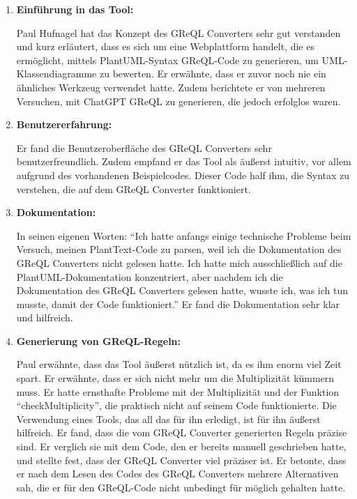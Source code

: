 \begin{enumerate}[itemsep=8pt, parsep=5pt]
    \item \textbf{Einführung in das Tool:}

    Paul Hufnagel hat das Konzept des GReQL Converters sehr gut verstanden und kurz erläutert, dass es sich um eine
    Webplattform handelt, die es ermöglicht, mittels PlantUML-Syntax GReQL-Code zu generieren, um
    UML-Klassendiagramme zu bewerten. Er erwähnte, dass er zuvor noch nie ein ähnliches Werkzeug verwendet hatte.
    Zudem berichtete er von mehreren Versuchen, mit ChatGPT GReQL zu generieren, die jedoch erfolglos waren.

    \item \textbf{Benutzererfahrung:}

    Er fand die Benutzeroberfläche des GReQL Converters sehr benutzerfreundlich. Zudem empfand er das Tool als äußerst
    intuitiv, vor allem aufgrund des vorhandenen Beispielcodes. Dieser Code half ihm, die Syntax zu verstehen, die auf
    dem GReQL Converter funktioniert.

    \item \textbf{Dokumentation:}

    In seinen eigenen Worten: ``Ich hatte anfangs einige technische Probleme beim Versuch, meinen PlantText-Code zu
    parsen, weil ich die Dokumentation des GReQL Converters nicht gelesen hatte. Ich hatte mich ausschließlich auf die
    PlantUML-Dokumentation konzentriert, aber nachdem ich die Dokumentation des GReQL Converters gelesen hatte, wusste
    ich, was ich tun musste, damit der Code funktioniert.'' Er fand die Dokumentation sehr klar und hilfreich.


    \item \textbf{Generierung von GReQL-Regeln:}

    Paul erwähnte, dass das Tool äußerst nützlich ist, da es ihm enorm viel Zeit spart. Er erwähnte, dass er sich nicht
    mehr um die Multiplizität kümmern muss. Er hatte ernsthafte Probleme mit der Multiplizität und der Funktion
    ``checkMultiplicity'', die praktisch nicht auf seinem Code funktionierte. Die Verwendung eines Tools, das all das
    für ihn erledigt, ist für ihn äußerst hilfreich. Er fand, dass die vom GReQL Converter generierten Regeln präzise
    sind. Er verglich sie mit dem Code, den er bereits manuell geschrieben hatte, und stellte fest, dass der GReQL
    Converter viel präziser ist. Er betonte, dass er nach dem Lesen des Codes des GReQL Converters mehrere Alternativen
    sah, die er für den GReQL-Code nicht unbedingt für möglich gehalten hatte.



\end{enumerate}
